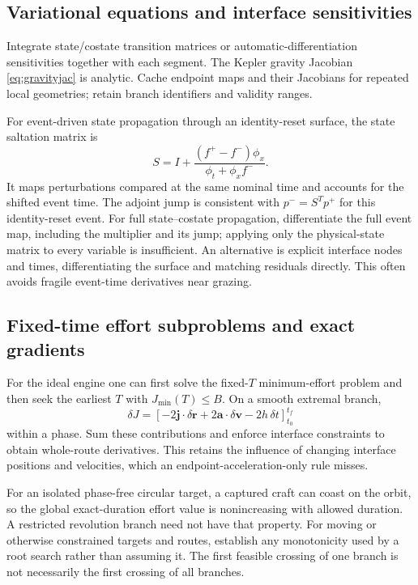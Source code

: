\documentclass[journal, a4paper]{IEEEtran}
\begin{document}
\subsection{Variational equations and interface sensitivities}
Integrate state/costate transition matrices or automatic-differentiation sensitivities together with each segment. The Kepler gravity Jacobian \eqref{eq:gravityjac} is analytic. Cache endpoint maps and their Jacobians for repeated local geometries; retain branch identifiers and validity ranges.

For event-driven state propagation through an identity-reset surface, the state saltation matrix is
\begin{equation}
 S=I+\frac{(f^+-f^-)\phi_x}{\phi_t+\phi_x f^-}.
 \label{eq:saltation}
\end{equation}
It maps perturbations compared at the same nominal time and accounts for the shifted event time. The adjoint jump is consistent with $p^-=S^Tp^+$ for this identity-reset event. For full state--costate propagation, differentiate the full event map, including the multiplier and its jump; applying only the physical-state matrix to every variable is insufficient. An alternative is explicit interface nodes and times, differentiating the surface and matching residuals directly. This often avoids fragile event-time derivatives near grazing.

\subsection{Fixed-time effort subproblems and exact gradients}
For the ideal engine one can first solve the fixed-$T$ minimum-effort problem and then seek the earliest $T$ with $J_{\min}(T)\le B$. On a smooth extremal branch,
\begin{equation}
 \delta J=\left[-2\mathbf j\cdot\delta\mathbf r+
     2\mathbf a\cdot\delta\mathbf v-2h\,\delta t\right]_{t_0}^{t_f}
 \label{eq:gradient}
\end{equation}
within a phase. Sum these contributions and enforce interface constraints to obtain whole-route derivatives. This retains the influence of changing interface positions and velocities, which an endpoint-acceleration-only rule misses.

For an isolated phase-free circular target, a captured craft can coast on the orbit, so the global exact-duration effort value is nonincreasing with allowed duration. A restricted revolution branch need not have that property. For moving or otherwise constrained targets and routes, establish any monotonicity used by a root search rather than assuming it. The first feasible crossing of one branch is not necessarily the first crossing of all branches.
\end{document}
